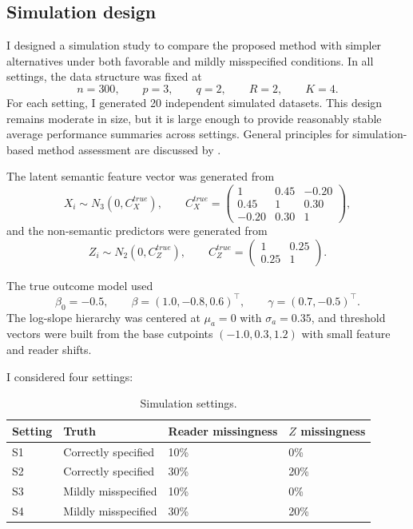 \documentclass[twoside,11pt]{article}
\begin{document}
\subsection{Simulation design}

I designed a simulation study to compare the proposed method with simpler alternatives under both favorable and mildly misspecified conditions. In all settings, the data structure was fixed at
\[
n=300, \qquad p=3, \qquad q=2, \qquad R=2, \qquad K=4.
\]
For each setting, I generated 20 independent simulated datasets. This design remains moderate in size, but it is large enough to provide reasonably stable average performance summaries across settings. General principles for simulation-based method assessment are discussed by \citet{Morris2019}.

The latent semantic feature vector was generated from
\[
X_i \sim N_3(0,C_X^{true}),
\qquad
C_X^{true} =
\begin{pmatrix}
1 & 0.45 & -0.20 \\
0.45 & 1 & 0.30 \\
-0.20 & 0.30 & 1
\end{pmatrix},
\]
and the non-semantic predictors were generated from
\[
Z_i \sim N_2(0,C_Z^{true}),
\qquad
C_Z^{true} =
\begin{pmatrix}
1 & 0.25 \\
0.25 & 1
\end{pmatrix}.
\]

The true outcome model used
\[
\beta_0=-0.5, \qquad
\beta=(1.0,-0.8,0.6)^\top, \qquad
\gamma=(0.7,-0.5)^\top.
\]
The log-slope hierarchy was centered at $\mu_a=0$ with $\sigma_a=0.35$, and threshold vectors were built from the base cutpoints $(-1.0,0.3,1.2)$ with small feature and reader shifts.

I considered four settings:

\begin{table}[H]
\centering
\small
\caption{Simulation settings.}
\begin{tabular}{llll}
\hline
Setting & Truth & Reader missingness & $Z$ missingness \\
\hline
S1 & Correctly specified & 10\% & 0\% \\
S2 & Correctly specified & 30\% & 20\% \\
S3 & Mildly misspecified & 10\% & 0\% \\
S4 & Mildly misspecified & 30\% & 20\% \\
\hline
\end{tabular}
\end{table}
\end{document}

